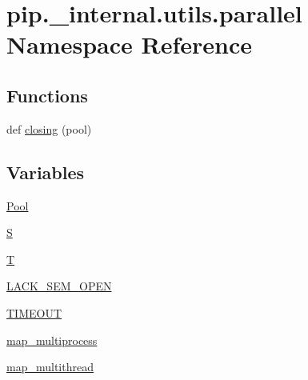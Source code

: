 \hypertarget{namespacepip_1_1__internal_1_1utils_1_1parallel}{}\section{pip.\+\_\+internal.\+utils.\+parallel Namespace Reference}
\label{namespacepip_1_1__internal_1_1utils_1_1parallel}
\subsection*{Functions}
\begin{DoxyCompactItemize}
\item 
def \hyperlink{namespacepip_1_1__internal_1_1utils_1_1parallel_a08bb2c13a5c8f31693fffedc06015272}{closing} (pool)
\end{DoxyCompactItemize}
\subsection*{Variables}
\begin{DoxyCompactItemize}
\item 
\hyperlink{namespacepip_1_1__internal_1_1utils_1_1parallel_a915958e5b3ae0e9d29f8c0bc46843adc}{Pool}
\item 
\hyperlink{namespacepip_1_1__internal_1_1utils_1_1parallel_a36e65bf7762c44bb45297b9225a35bea}{S}
\item 
\hyperlink{namespacepip_1_1__internal_1_1utils_1_1parallel_ae7ad6c54f1ad91b836e8491dd87c1ff5}{T}
\item 
\hyperlink{namespacepip_1_1__internal_1_1utils_1_1parallel_a58f1f819a3644abf0a89259696e894b5}{L\+A\+C\+K\+\_\+\+S\+E\+M\+\_\+\+O\+P\+EN}
\item 
\hyperlink{namespacepip_1_1__internal_1_1utils_1_1parallel_ade8851f49238e66c70377dcb824ccf9b}{T\+I\+M\+E\+O\+UT}
\item 
\hyperlink{namespacepip_1_1__internal_1_1utils_1_1parallel_ab00a474b1469fe1cd6565cd4ca41e8ae}{map\+\_\+multiprocess}
\item 
\hyperlink{namespacepip_1_1__internal_1_1utils_1_1parallel_a27efd79dfd412e237493abd341084730}{map\+\_\+multithread}
\end{DoxyCompactItemize}


